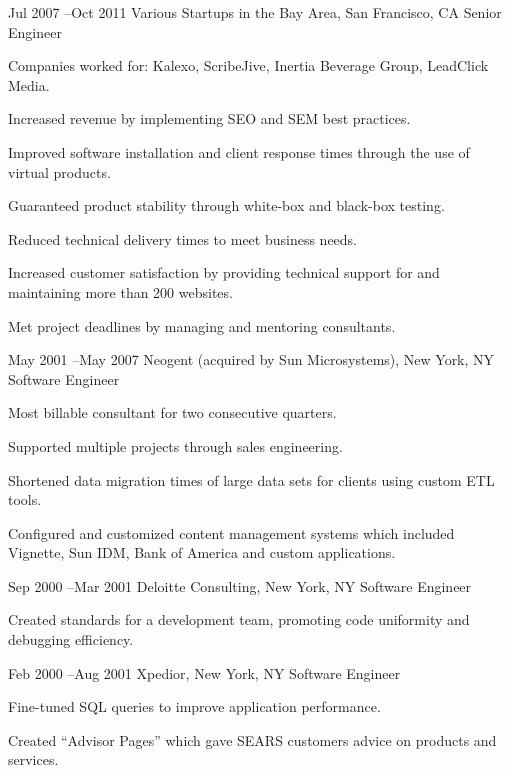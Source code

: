 \documentclass[10pt]{article} %
\begin{document}
\job
{Jul 2007 --}{Oct 2011}
{Various Startups in the Bay Area, San Francisco, CA}
{}
{Senior Engineer}
{
\begin{itemize-noindent}

\item{Companies worked for: Kalexo, ScribeJive, Inertia Beverage Group, LeadClick Media.} 
\item{Increased revenue by implementing SEO and SEM best practices.}
\item{Improved software installation and client response times through the use of virtual products.}
\item{Guaranteed product stability through white-box and black-box testing.}
\item{Reduced technical delivery times to meet business needs.} 
\item{Increased customer satisfaction by providing technical support for and maintaining more than 200 websites.}
\item{Met project deadlines by managing and mentoring consultants.}

\end{itemize-noindent}
}


\job
{May 2001 --}{May 2007}
{Neogent (acquired by Sun Microsystems), New York, NY}
{}
{Software Engineer}
{
\begin{itemize-noindent}
\item{Most billable consultant for two consecutive quarters.} 
\item{Supported multiple projects through sales engineering.} 
\item{Shortened data migration times of large data sets for clients using custom ETL tools.} 
\item{Configured and customized content management systems which included Vignette, Sun IDM, Bank of America and custom applications.} 
\end{itemize-noindent}
}



\job
{Sep 2000 --}{Mar 2001}
{Deloitte Consulting, New York, NY}
{}
{Software Engineer}
{
\begin{itemize-noindent}
\item{Created standards for a development team, promoting code uniformity and debugging efficiency.}
\end{itemize-noindent}
}


\job
{Feb 2000 --}{Aug 2001}
{Xpedior, New York, NY}
{}
{Software Engineer}
{
\begin{itemize-noindent}
\item{Fine-tuned SQL queries to improve application performance.}
\item{Created “Advisor Pages” which gave SEARS customers advice on products and services.}
\end{itemize-noindent}
}
\end{document}
